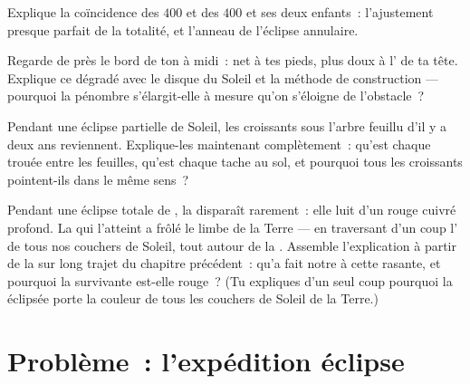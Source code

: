 \begin{exercise}[$\star\star$]\label{exo:g7:shadows-eclipses:9}
Explique la coïncidence des $400$ et des $400$ et ses deux enfants~:
l'ajustement presque parfait de la totalité, et l'anneau de l'éclipse
annulaire.
\end{exercise}

\begin{exercise}[$\star\star$]\label{exo:g7:shadows-eclipses:10}
Regarde de près le bord de ton  à midi~: net à tes pieds, plus
doux à l' de ta tête. Explique ce dégradé avec le disque du
Soleil et la méthode de construction --- pourquoi la pénombre
s'élargit-elle à mesure qu'on s'éloigne de l'obstacle~?
\end{exercise}

\begin{exercise}[$\star\star$]\label{exo:g7:shadows-eclipses:11}
Pendant une éclipse partielle de Soleil, les croissants sous l'arbre
feuillu d'il y a deux ans reviennent. Explique-les maintenant
complètement~: qu'est chaque trouée entre les feuilles, qu'est chaque
tache au sol, et pourquoi tous les croissants pointent-ils dans le
même sens~?
\end{exercise}

\begin{exercise}[$\star\star\star$]\label{exo:g7:shadows-eclipses:12}
Pendant une éclipse totale de \emph{}, la  disparaît
rarement~: elle luit d'un rouge cuivré profond. La  qui
l'atteint a frôlé le limbe de la Terre --- en traversant d'un coup
l' de tous nos couchers de Soleil, tout autour de la .
Assemble l'explication à partir de la  sur long trajet du
chapitre précédent~: qu'a fait notre  à cette 
rasante, et pourquoi la  survivante est-elle rouge~? (Tu
expliques d'un seul coup pourquoi la  éclipsée porte la couleur
de tous les couchers de Soleil de la Terre.)
\end{exercise}

\section{Problème~: l'expédition éclipse}

